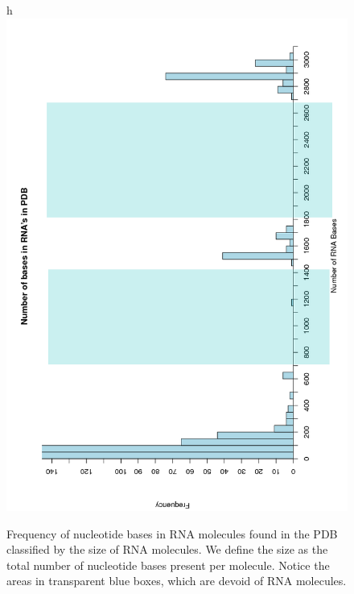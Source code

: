 \begin{figure}{h}
\centering
\includegraphics[scale=0.50, angle=-90]{Chapter2/histogram.png}
\caption{Frequency of  nucleotide bases in RNA molecules  found in the
  PDB classified by  the size of RNA molecules. We  define the size as
  the total  number of nucleotide  bases present per  molecule. Notice
  the  areas  in  transparent  blue  boxes, which  are  devoid of  RNA
  molecules.}
  \label{fig:rnaranges}
\end{figure}

